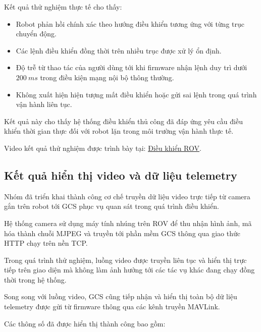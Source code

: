 \documentclass[../DoAn.tex]{subfiles}
\begin{document}
Kết quả thử nghiệm thực tế cho thấy:

\begin{itemize}
    \item Robot phản hồi chính xác theo hướng điều khiển tương ứng với từng trục chuyển động.
    
    \item Các lệnh điều khiển đồng thời trên nhiều trục được xử lý ổn định.
    
    \item Độ trễ từ thao tác của người dùng tới khi firmware nhận lệnh duy trì dưới $200\ ms$ trong điều kiện mạng nội bộ thông thường.
    
    \item Không xuất hiện hiện tượng mất điều khiển hoặc gửi sai lệnh trong quá trình vận hành liên tục.
\end{itemize}

Kết quả này cho thấy hệ thống điều khiển thủ công đã đáp ứng yêu cầu điều khiển thời gian thực đối với robot lặn trong môi trường vận hành thực tế.

Video kết quả thử nghiệm được trình bày tại: \href{https://drive.google.com/file/d/11iHc4Oya20JVWQp25lEVBZ62LGkQiPMb/view?usp=drive_link}{\underline{Điều khiển ROV}}.

\subsection{Kết quả hiển thị video và dữ liệu telemetry}

Nhóm đã triển khai thành công cơ chế truyền dữ liệu video trực tiếp từ camera gắn trên robot tới GCS phục vụ quan sát trong quá trình điều khiển.

Hệ thống camera sử dụng máy tính nhúng trên ROV để thu nhận hình ảnh, mã hóa thành chuỗi MJPEG và truyền tới phần mềm GCS thông qua giao thức HTTP chạy trên nền TCP.

Trong quá trình thử nghiệm, luồng video được truyền liên tục và hiển thị trực tiếp trên giao diện mà không làm ảnh hưởng tới các tác vụ khác đang chạy đồng thời trong hệ thống.

Song song với luồng video, GCS cũng tiếp nhận và hiển thị toàn bộ dữ liệu telemetry được gửi từ firmware thông qua các kênh truyền MAVLink.

Các thông số đã được hiển thị thành công bao gồm:
\end{document}
